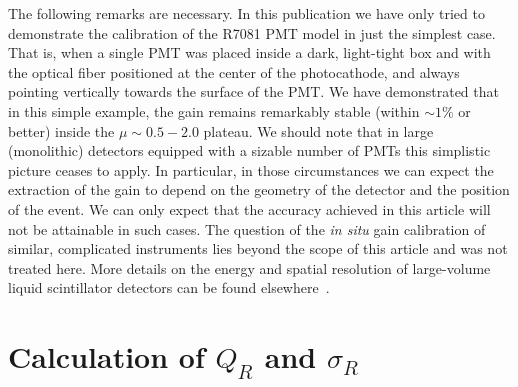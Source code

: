 \documentclass[a4paper,11pt]{article}
\begin{document}
The following remarks are necessary. 
In this publication we have only tried to demonstrate the calibration of the R7081 PMT model in just the simplest case. 
That is, when a single PMT was placed inside a dark, light-tight box and with the optical fiber positioned at the center of the photocathode, and always pointing vertically towards the surface of the PMT. 
We have demonstrated that in this simple example, the gain remains remarkably stable (within $\sim 1\%$ or better) inside the $\mu \sim 0.5 - 2.0$ plateau. 
We should note that in large (monolithic) detectors equipped with a sizable number of PMTs this simplistic picture ceases to apply. 
In particular, in those circumstances we can expect the extraction of the gain to depend on the geometry of the detector and the position of the event. 
 We can only expect that the accuracy achieved in this article will not be attainable in such cases.
The question of the \emph{in situ} gain calibration of similar, complicated instruments lies beyond the scope of this article and was not treated here. 
More details on the energy and spatial resolution of large-volume liquid scintillator detectors can be found elsewhere~\cite{smirnov}. 




\appendix
%

\section{Calculation of $Q_R$ and $\sigma_R$}
\label{appA}
\end{document}
